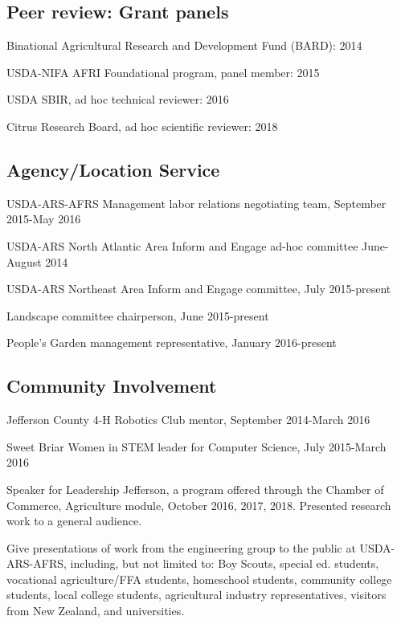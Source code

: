 \documentclass[letterpaper,11pt]{article}
\begin{document}
\subsection{Peer review: Grant panels}
\begin{enumerate}[noitemsep, leftmargin=*,label={[\arabic*]}]
\item{Binational Agricultural Research and Development Fund (BARD): 2014}
\item{USDA-NIFA AFRI Foundational program, panel member: 2015}
\item{USDA SBIR, ad hoc technical reviewer: 2016}
\item{Citrus Research Board, ad hoc scientific reviewer: 2018}
\end{enumerate}



\subsection{Agency/Location Service}
\begin{enumerate}[noitemsep, leftmargin=*,label={[\arabic*]}]
\item{USDA-ARS-AFRS Management labor relations negotiating team, September 2015-May 2016}
\item{USDA-ARS North Atlantic Area Inform and Engage ad-hoc committee June-August 2014}
\item{USDA-ARS Northeast Area Inform and Engage committee, July 2015-present}
\item{Landscape committee chairperson, June 2015-present}
\item{People's Garden management representative, January 2016-present}
\end{enumerate}

\subsection{Community Involvement}
\begin{enumerate}[noitemsep, leftmargin=*,label={[\arabic*]}]
\item{Jefferson County 4-H Robotics Club mentor, September 2014-March 2016}
\item{Sweet Briar Women in STEM leader for Computer Science, July 2015-March 2016}
\item{Speaker for Leadership Jefferson, a program offered through the Chamber of Commerce, Agriculture module, October 2016, 2017, 2018.  Presented research work to a general audience.}
\item{Give presentations of work from the engineering group to the public at USDA-ARS-AFRS, including, but not limited to: Boy Scouts, special ed. students, vocational agriculture/FFA students, homeschool students, community college students, local college students, agricultural industry representatives, visitors from New Zealand, and universities.}
\end{enumerate}
\end{document}
